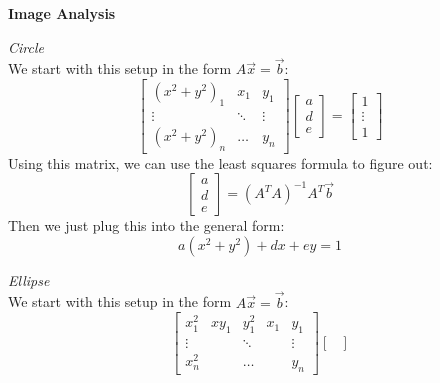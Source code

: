 \documentclass[letter]{article}
\newenvironment{menumerate}{\edef\backupindent{\the\parindent}
  \enumerate\setlength{\parindent}{\backupindent}}
  {\endenumerate}
\begin{document}
\begin{menumerate}
    \newpage
    \item \textbf{Image Analysis}
    \begin{menumerate}
        \item \emph{Circle}\\
        We start with this setup in the form $A\vec{x} = \vec{b}$:
        \begin{equation*}
            \begin{bmatrix}
                (x^2+y^2)_1&x_1&y_1\\
                \vdots&\ddots&\vdots\\
                (x^2+y^2)_n&\dots&y_n
            \end{bmatrix}
            \begin{bmatrix}
                a\\d\\e
            \end{bmatrix}
            =
            \begin{bmatrix}
                1\\\vdots\\1
            \end{bmatrix}
        \end{equation*}
        Using this matrix, we can use the least squares formula to figure out:
        \begin{equation*}
            \begin{bmatrix}
                a\\d\\e
            \end{bmatrix}
            = (A^TA)^{-1}A^T\vec{b}
        \end{equation*}
        Then we just plug this into the general form:
        \begin{equation*}
            a(x^2+y^2) + dx + ey = 1
        \end{equation*}
        \item \emph{Ellipse}\\
        We start with this setup in the form $A\vec{x} = \vec{b}$:
        \begin{equation*}
            \begin{bmatrix}
                x^2_1&xy_1&y^2_1&x_1&y_1\\
                \vdots&&\ddots&&\vdots\\
                x^2_n&&\dots&&y_n
            \end{bmatrix}
            \begin{bmatrix}

\end{bmatrix}
\end{equation*}
\end{menumerate}
\end{menumerate}
\end{document}
